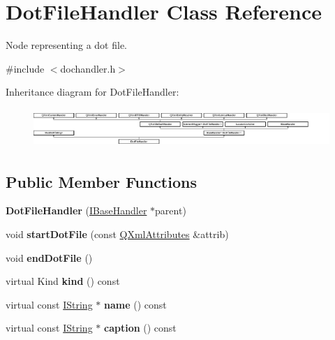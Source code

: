 \hypertarget{class_dot_file_handler}{}\section{Dot\+File\+Handler Class Reference}
\label{class_dot_file_handler}


Node representing a dot file.  




{\ttfamily \#include $<$dochandler.\+h$>$}

Inheritance diagram for Dot\+File\+Handler\+:\begin{figure}[H]
\begin{center}
\leavevmode
\includegraphics[height=1.474654cm]{class_dot_file_handler}
\end{center}
\end{figure}
\subsection*{Public Member Functions}
\begin{DoxyCompactItemize}
\item 
\mbox{\label{class_dot_file_handler_a6e2366630778c0d6e2e41cc9208866bd}} 
{\bfseries Dot\+File\+Handler} (\mbox{\hyperlink{class_i_base_handler}{I\+Base\+Handler}} $\ast$parent)
\item 
\mbox{\label{class_dot_file_handler_a8359f486d61c0de4124f617d24e7f4d3}} 
void {\bfseries start\+Dot\+File} (const \mbox{\hyperlink{class_q_xml_attributes}{Q\+Xml\+Attributes}} \&attrib)
\item 
\mbox{\label{class_dot_file_handler_acfa69c7201288348f6e3256c9ea268fa}} 
void {\bfseries end\+Dot\+File} ()
\item 
\mbox{\label{class_dot_file_handler_a634b8e9ebf21b1afeead2c320195bca5}} 
virtual Kind {\bfseries kind} () const
\item 
\mbox{\label{class_dot_file_handler_a88a5691a19b66b92567c43c70bf15fc0}} 
virtual const \mbox{\hyperlink{class_i_string}{I\+String}} $\ast$ {\bfseries name} () const
\item 
\mbox{\label{class_dot_file_handler_a40b24961a94c779ce78896c0075b3b71}} 
virtual const \mbox{\hyperlink{class_i_string}{I\+String}} $\ast$ {\bfseries caption} () const
\end{DoxyCompactItemize}

